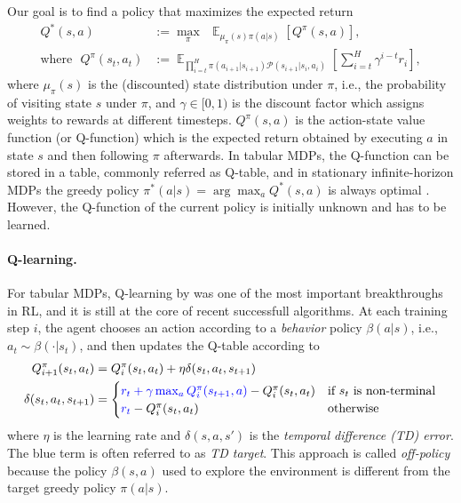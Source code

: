 \documentclass{article}
\DeclareMathOperator{\EV}{\mathbb{E}}
\newcommand{\EVV}[2]{\EV_{#1}\!\left[{#2}\right]}
\newcommand{\action}{a}
\newcommand{\state}{s}
\providecommand{\prob}{\mathcal{P}}
\begin{document}
Our goal is to find a policy that maximizes the expected return
\begin{align}
	Q^*(s,a) &:= \max_\pi \:\: \EVV{\mu_\pi(\state) \pi(\action|\state)}{Q^{\pi}(\state,\action)}, \label{eq:maxQ}
	\\
	\textrm{where} \:\:\:
	Q^{\pi}(\state_t,\action_t) &:= \EVV{\prod_{i=t}^H \pi(a_{i+1}|s_{i+1})\prob(s_{i+1}|s_{i},a_{i})}{\sum_{i=t}^H \gamma^{i-t} r_{i}},  \label{eq:Q}
\end{align}
where $\mu_\pi(\state)$ is the (discounted) state distribution under $\pi$, i.e., the probability of visiting state $\state$ under $\pi$, and $\gamma \in [0,1)$ is the discount factor which assigns weights to rewards at different timesteps. $Q^{\pi}(\state,\action)$ is the action-state value function (or Q-function) which is the expected return obtained by executing $a$ in state $s$ and then following $\pi$ afterwards. 
In tabular MDPs, the Q-function can be stored in a table, commonly referred as Q-table, and in stationary infinite-horizon MDPs the greedy policy $\pi^*(a|s) =\arg\max_a Q^*(s,a)$ is always optimal \citep{puterman1994markov}. 
However, the Q-function of the current policy is initially unknown and has to be learned. 

\paragraph{Q-learning.}
For tabular MDPs, Q-learning by \citet{watkins1992q} was one of the most  important breakthroughs in RL, and it is still at the core of recent successfull algorithms. 
At each training step $i$, the agent chooses an action according to a \textit{behavior} policy $\beta(a|s)$, i.e., $a_t \sim \beta(\cdot|s_t)$, and then updates the Q-table according to
\begin{align}
	Q_{i+1}^\pi(s_t,a_t) &= Q_i^\pi(s_t,a_t) + \eta \delta(s_t,a_t,s_{t+1})
	\\
	\delta(s_t,a_t,s_{t+1}) &= 	\begin{cases}
	\textcolor{blue}{r_t + \gamma \max_a Q_i^\pi(s_{t+1},a)} - Q_i^\pi(s_t,a_t) & \text{if $s_t$ is non-terminal}
	\\
	\textcolor{blue}{r_t} - Q_i^\pi(s_t,a_t) & \text{otherwise}
	\end{cases}
\end{align}
where $\eta$ is the learning rate and $\delta(s,a,s')$ is the \textit{temporal difference (TD) error}. The blue term is often referred to as \textit{TD target}. This approach is called \textit{off-policy} because the policy $\beta(s,a)$ used to explore the environment is different from the target greedy policy $\pi(a|s)$.
\end{document}
